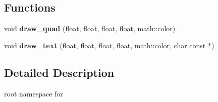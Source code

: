 \subsection*{\-Functions}
\begin{DoxyCompactItemize}
\item 
\hypertarget{namespaceglutpp_a98fb688fba243efd18aa4b5573246484}{void {\bfseries draw\-\_\-quad} (float, float, float, float, math\-::color)}\label{namespaceglutpp_a98fb688fba243efd18aa4b5573246484}

\item 
\hypertarget{namespaceglutpp_ab77ba9aee5905156f950bb7b992fc72c}{void {\bfseries draw\-\_\-text} (float, float, float, float, math\-::color, char const $\ast$)}\label{namespaceglutpp_ab77ba9aee5905156f950bb7b992fc72c}

\end{DoxyCompactItemize}


\subsection{\-Detailed \-Description}
root namespace for  